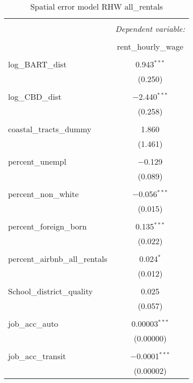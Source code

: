 \documentclass[10pt, letterpaper]{amsart}
\begin{document}
\begin{table}[H] \centering 
  \caption{Spatial error model RHW all\_rentals} 
  \label{} 
  \begin{tabular}{@{\extracolsep{5pt}}lc} 
    \\[-1.8ex]\hline 
    \hline \\[-1.8ex] 
    & \multicolumn{1}{c}{\textit{Dependent variable:}} \\ 
    \cline{2-2} 
    \\[-1.8ex] & rent\_hourly\_wage \\ 
    \hline \\[-1.8ex] 
    log\_BART\_dist & 0.943$^{***}$ \\ 
    & (0.250) \\ 
    & \\ 
    log\_CBD\_dist & $-$2.440$^{***}$ \\ 
    & (0.258) \\ 
    & \\ 
    coastal\_tracts\_dummy & 1.860 \\ 
    & (1.461) \\ 
    & \\ 
    percent\_unempl & $-$0.129 \\ 
    & (0.089) \\ 
    & \\ 
    percent\_non\_white & $-$0.056$^{***}$ \\ 
    & (0.015) \\ 
    & \\ 
    percent\_foreign\_born & 0.135$^{***}$ \\ 
    & (0.022) \\ 
    & \\ 
    percent\_airbnb\_all\_rentals & 0.024$^{*}$ \\ 
    & (0.012) \\ 
    & \\ 
    School\_district\_quality & 0.025 \\ 
    & (0.057) \\ 
    & \\ 
    job\_acc\_auto & 0.00003$^{***}$ \\ 
    & (0.00000) \\ 
    & \\ 
    job\_acc\_transit & $-$0.0001$^{***}$ \\ 
    & (0.00002) \\ 

\end{tabular}
\end{table}
\end{document}
